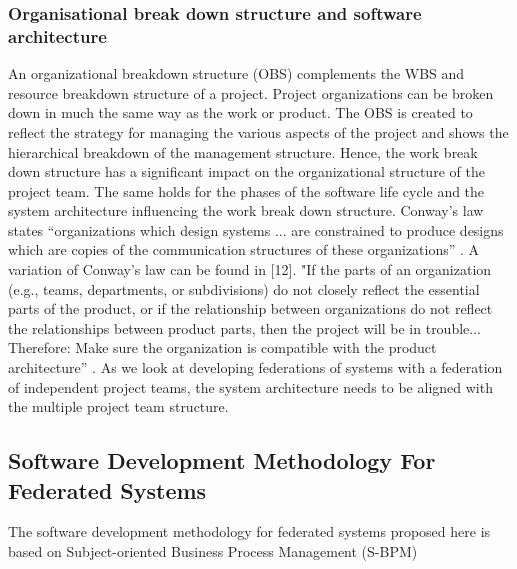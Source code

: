 \subsubsection{Organisational break down structure and software architecture}
An organizational breakdown structure (OBS) complements the WBS and resource breakdown structure of a project. Project organizations can be broken down in much the same way as the work or product. The OBS is created to reflect the strategy for managing the various aspects of the project and shows the hierarchical breakdown of the management structure. Hence, the work break down structure has a significant impact on the organizational structure of the project team. The same holds for the phases of the software life cycle and the system architecture influencing the work break down structure. Conway’s law states “organizations which design systems ... are constrained to produce designs which are copies of the communication structures of these organizations” \cite{article:ConwaysLaw}. A variation of Conway’s law can be found in [12]. "If the parts of an organization (e.g., teams, departments, or subdivisions) do not closely reflect the essential parts of the product, or if the relationship between organizations do not reflect the relationships between product parts, then the project will be in trouble... Therefore: Make sure the organization is compatible with the product architecture” \cite{book:OrgPatternsAgile}.
As we look at developing federations of systems with a federation of independent project teams, the system architecture needs to be aligned with the multiple project team structure.
\\

\subsection{Software Development Methodology For Federated Systems}
The software development methodology for federated systems proposed here is based on Subject-oriented Business Process Management (S-BPM)  


